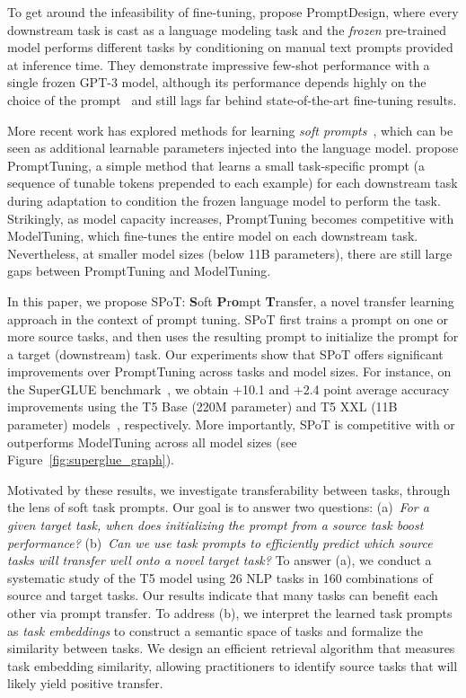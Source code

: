 To get around the infeasibility of fine-tuning, \citet{TBrown20} propose {\small \sc PromptDesign}, where every downstream task is cast as a language modeling task and the \textit{frozen} pre-trained model performs different tasks by conditioning on manual text prompts provided at inference time. They demonstrate impressive few-shot performance with a single frozen {\small \sc \mbox{GPT-3}} model, although its performance depends highly on the choice of the prompt~\cite{TZhao21} and still lags far behind state-of-the-art fine-tuning results.

More recent work has explored methods for learning \textit{soft prompts}~\cite{XLiu21,GQin21,XLi21,BLester21}, which can be seen as additional learnable parameters injected into the language model.
\citet{BLester21} propose {\small \sc PromptTuning}, a simple method that learns a small task-specific prompt (a sequence of tunable tokens prepended to each example) for each downstream task during adaptation to condition the frozen language model to perform the task. Strikingly, as model capacity increases, 
{\small \sc PromptTuning} becomes competitive with 
{\small \sc ModelTuning}, which fine-tunes the entire model on each downstream task. Nevertheless, at smaller model sizes (below 11B parameters), there are still large gaps between {\small \sc PromptTuning} and {\small \sc ModelTuning}.

In this paper, we propose {{\small \sc SPoT}}: \textbf{S}oft \textbf{P}r\textbf{o}mpt \textbf{T}ransfer, a novel transfer learning approach in the context of prompt tuning. 
{{\small \sc SPoT}} first trains a prompt on one or more source tasks, and then uses the resulting prompt to initialize the prompt for a target (downstream) task. Our experiments show that {{\small \sc SPoT}} offers significant improvements over {\small \sc PromptTuning} across tasks and model sizes. For instance, on the {\small \sc SuperGLUE} benchmark~\cite{AWang19b}, we obtain +10.1 and +2.4 point average accuracy improvements using the {\small \sc T5 Base} (220M parameter) and {\small \sc T5 XXL} (11B parameter) models~\cite{CRaffel20}, respectively. More importantly, {{\small \sc SPoT}} is competitive with or outperforms {\small \sc ModelTuning} across all model sizes (see Figure~\ref{fig:superglue_graph}).

Motivated by these results, we investigate transferability between tasks, through the lens of soft task prompts. Our goal is to answer two questions: (a)~\textit{For a given target task, when does initializing the prompt from a source task boost performance?} (b)~\textit{Can we use task prompts to efficiently predict which source tasks will transfer well onto a novel target task?} To answer (a), we conduct a systematic study of the {\small \sc T5} model using 26 {\small \sc NLP} tasks in 160 combinations of source and target tasks. Our results indicate that many tasks can benefit each other via prompt transfer. To address (b), we interpret the learned task prompts as \textit{task embeddings} to construct a semantic space of tasks and formalize the similarity between tasks. We design an efficient retrieval algorithm that measures task embedding similarity, allowing practitioners to identify source tasks that will likely yield positive transfer. 

